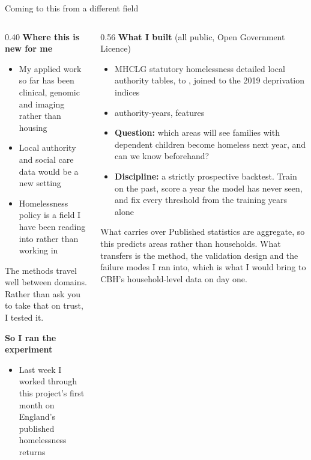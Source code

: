 \documentclass[aspectratio=169,11pt]{beamer}
\newcommand{\lead}[1]{{\color{seriesone}\bfseries #1}}
\newcommand{\smallcap}[1]{{\footnotesize\color{inktwo}#1}}
\begin{document}
\begin{frame}{Coming to this from a different field}
  \begin{columns}[T,onlytextwidth]
    \begin{column}{0.40\textwidth}
      \lead{Where this is new for me}
      \begin{itemize}\scriptsize
        \item My applied work so far has been clinical, genomic and imaging
              rather than housing
        \item Local authority and social care data would be a new setting
        \item Homelessness policy is a field I have been reading into rather
              than working in
      \end{itemize}
      \vspace{1mm}
      \smallcap{The methods travel well between domains. Rather than ask you to
      take that on trust, I tested it.}
      \vspace{2mm}

      \lead{So I ran the experiment}
      \begin{itemize}\scriptsize
        \item Last week I worked through this project's first month on
              England's published homelessness returns
      \end{itemize}
    \end{column}
    \begin{column}{0.56\textwidth}
      \lead{What I built} \smallcap{(all public, Open Government Licence)}
      \begin{itemize}\scriptsize
        \item MHCLG statutory homelessness detailed local authority tables,
              \FirstYear{} to \LastYear, joined to the 2019 deprivation indices
        \item \NumAuthorityYears{} authority-years, \NumFeatures{} features
        \item \lead{Question:} which areas will see families with dependent
              children become homeless next year, and can we know beforehand?
        \item \lead{Discipline:} a strictly prospective backtest. Train on the
              past, score a year the model has never seen, and fix every
              threshold from the training years alone
      \end{itemize}
      \vspace{1mm}
      \begin{block}{What carries over}
        \scriptsize
        Published statistics are aggregate, so this predicts areas rather than
        households. What transfers is the method, the validation design and the
        failure modes I ran into, which is what I would bring to CBH's
        household-level data on day one.
      \end{block}
    \end{column}
  \end{columns}
\end{frame}
\end{document}
